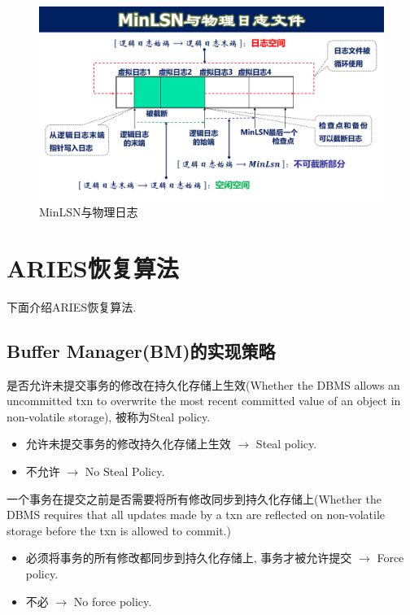 \begin{figure}[H]
    \centering
    \includegraphics[width=.9\textwidth]{figure/MINLSN与物理日志.pdf}
    \caption{MinLSN与物理日志}
\end{figure}


\section{ARIES恢复算法}

下面介绍ARIES恢复算法\cite{10.1145/128765.128770}.

\subsection{Buffer Manager(BM)的实现策略}

\begin{definition}
是否允许未提交事务的修改在持久化存储上生效(Whether the DBMS allows an uncommitted txn to overwrite the most recent committed value of an object in non-volatile storage), 被称为Steal policy.
\begin{itemize}
    \item 允许未提交事务的修改持久化存储上生效 $\to$ Steal policy.
    \item 不允许 $\to$ No Steal Policy.
\end{itemize}
\end{definition}

\begin{definition}
一个事务在提交之前是否需要将所有修改同步到持久化存储上(Whether the DBMS requires that all updates made by a txn are reflected on non-volatile storage before the txn is allowed to commit.)
\begin{itemize}
    \item 必须将事务的所有修改都同步到持久化存储上, 事务才被允许提交 $\to$ Force policy.
    \item 不必 $\to$ No force policy.
\end{itemize}
\end{definition}

